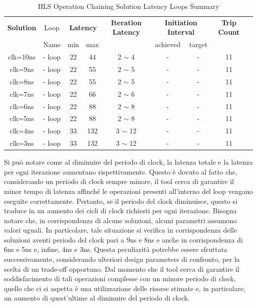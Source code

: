 \begin{table}[H]
    \centering
    \begin{tabular}{|c|c|c|c|c|c|c|c|c|}
        \hline
        \multicolumn{1}{|c|}{\textbf{Solution}} & \multicolumn{1}{|c|}{Loop} & \multicolumn{2}{|c|}{\textbf{Latency}} & \multicolumn{1}{c|}{\textbf{Iteration Latency}} & \multicolumn{2}{c|}{\textbf{Initiation Interval}} & \multicolumn{1}{c|}{\textbf{Trip Count}}  \\
        & Name & min & max &  & achieved & target &  \\
        \hline
        clk=10ns & - loop & 22 & 44 & 2 $\sim$ 4 & - & - & 11 \\
        \hline
        clk=9ns & - loop & 22 & 55 & 2 $\sim$ 5 & - & - & 11 \\
        \hline
        clk=8ns & - loop & 22 & 55 & 2 $\sim$ 5 & - & - & 11 \\
        \hline
        clk=7ns & - loop & 22 & 66 & 2 $\sim$ 6 & - & - & 11 \\
        \hline
        clk=6ns & - loop & 22 & 88 & 2 $\sim$ 8 & - & - & 11 \\
        \hline
        clk=5ns & - loop & 22 & 88 & 2 $\sim$ 8 & - & - & 11 \\
        \hline
        clk=4ns & - loop & 33 & 132 & 3 $\sim$ 12 & - & - & 11 \\
        \hline
        clk=3ns & - loop & 33 & 132 & 3 $\sim$ 12 & - & - & 11 \\
        \hline
    \end{tabular}
    \caption{HLS Operation Chaining Solution Latency Loops Summary }
    \label{tab:hls-operation-chaining-solution-loop-summary}
\end{table}
Si può notare come al diminuire del periodo di clock, la latenza totale e la latenza per ogni iterazione aumentano rispettivamente. Questo è dovuto al fatto che, considerando un periodo di clock sempre minore, il tool cerca di garantire il minor tempo di latenza affinché le operazioni presenti all'interno del loop vengano eseguite correttamente. Pertanto, se il periodo del clock diminuisce, questo si traduce in un aumento dei cicli di clock richiesti per ogni iterazione. Bisogna notare che, in corrispondenza di alcune soluzioni, alcuni parametri assumono valori uguali. In particolare, tale situazione si verifica in corrispondenza delle soluzioni aventi periodo del clock pari a 9ns e 8ns e anche in corrispondenza di 6ns e 5ns e, infine, 4ns e 3ns. Questa peculiarità potrebbe essere sfruttata successivamente, considerando ulteriori design parameters di confronto, per la scelta di un trade-off opportuno. Dal momento che il tool cerca di garantire il soddisfacimento di tali operazioni complesse con un minore periodo di clock, quello che ci si aspetta è una utilizzazione delle risorse stimate e, in particolare, un aumento di quest'ultime al diminuire del periodo di clock.
